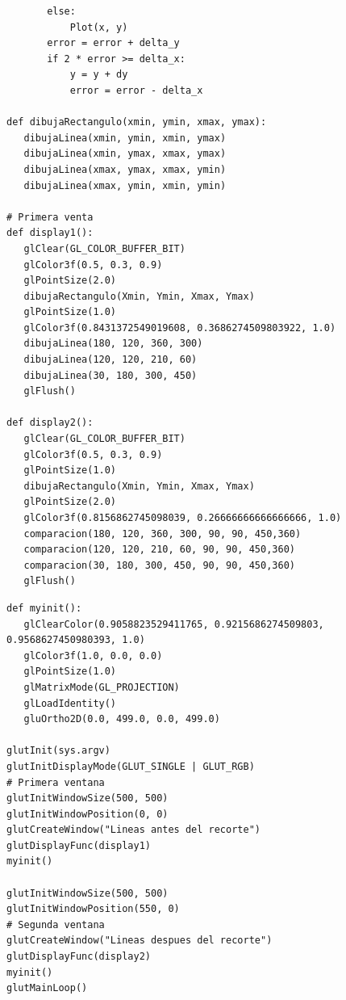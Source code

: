 \documentclass[a4paper]{article}
\begin{document}
\newpage
\begin{center}
\begin{mycodebox}
\begin{lstlisting}
       else:
           Plot(x, y)
       error = error + delta_y
       if 2 * error >= delta_x:
           y = y + dy
           error = error - delta_x

def dibujaRectangulo(xmin, ymin, xmax, ymax):
   dibujaLinea(xmin, ymin, xmin, ymax)
   dibujaLinea(xmin, ymax, xmax, ymax)
   dibujaLinea(xmax, ymax, xmax, ymin)
   dibujaLinea(xmax, ymin, xmin, ymin)

# Primera venta
def display1():
   glClear(GL_COLOR_BUFFER_BIT)
   glColor3f(0.5, 0.3, 0.9) 
   glPointSize(2.0)
   dibujaRectangulo(Xmin, Ymin, Xmax, Ymax)
   glPointSize(1.0)
   glColor3f(0.8431372549019608, 0.3686274509803922, 1.0)
   dibujaLinea(180, 120, 360, 300)
   dibujaLinea(120, 120, 210, 60)
   dibujaLinea(30, 180, 300, 450)
   glFlush()

def display2():
   glClear(GL_COLOR_BUFFER_BIT)
   glColor3f(0.5, 0.3, 0.9) 
   glPointSize(1.0)
   dibujaRectangulo(Xmin, Ymin, Xmax, Ymax)
   glPointSize(2.0)
   glColor3f(0.8156862745098039, 0.26666666666666666, 1.0)
   comparacion(180, 120, 360, 300, 90, 90, 450,360)
   comparacion(120, 120, 210, 60, 90, 90, 450,360)
   comparacion(30, 180, 300, 450, 90, 90, 450,360)
   glFlush()
\end{lstlisting}
\end{mycodebox}
\end{center}
\newpage
\begin{center}
\begin{mycodebox}
\begin{lstlisting}
def myinit():
   glClearColor(0.9058823529411765, 0.9215686274509803, 0.9568627450980393, 1.0)
   glColor3f(1.0, 0.0, 0.0)
   glPointSize(1.0)
   glMatrixMode(GL_PROJECTION)
   glLoadIdentity()
   gluOrtho2D(0.0, 499.0, 0.0, 499.0)

glutInit(sys.argv)
glutInitDisplayMode(GLUT_SINGLE | GLUT_RGB)
# Primera ventana
glutInitWindowSize(500, 500)
glutInitWindowPosition(0, 0)
glutCreateWindow("Lineas antes del recorte")
glutDisplayFunc(display1)
myinit()

glutInitWindowSize(500, 500)
glutInitWindowPosition(550, 0)
# Segunda ventana
glutCreateWindow("Lineas despues del recorte")
glutDisplayFunc(display2)
myinit()
glutMainLoop()

\end{lstlisting}
\end{mycodebox}
\end{center}
\end{document}
